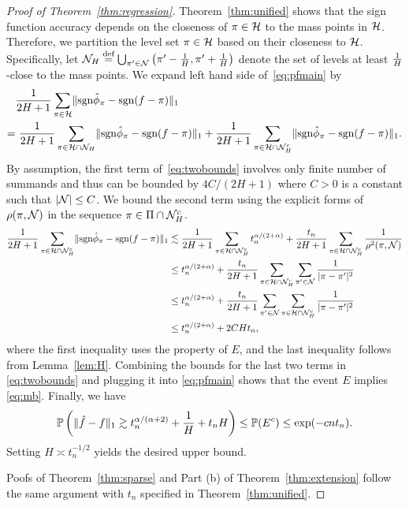 \documentclass[11pt]{article}
\theoremstyle{plain}
\theoremstyle{definition}
\def\sign{\textup{sgn}}
\begin{document}
\begin{proof}[Proof of Theorem~\ref{thm:regression}]
Theorem~\ref{thm:unified} shows that the sign function accuracy depends on the closeness of $\pi\in \mathcal{H}$ to the mass points in $\mathcal{H}$. Therefore, we partition the level set $\pi \in \mathcal{H}$ based on their closeness to $\mathcal{H}$. Specifically, let $\mathcal{N}_H \stackrel{\text{def}}{=}\bigcup_{\pi'\in\mathcal{N}}\left(\pi'-\frac{1}{H},\pi'+\frac{1}{H}\right)$ denote the set of levels at least $1\over H$-close to the mass points. We expand left hand side of~\eqref{eq:pfmain} by
\begin{align}\label{eq:twobounds}
&{1\over 2H+1}\sum_{\pi \in \tH}\onenormSize{}{\sign \hat \phi_\pi - \sign (f-\pi)} \notag \\
=& \ {1\over 2H+1}\sum_{\pi \in \tH \cap \tN_H} \onenormSize{}{\sign \hat \phi_\pi - \sign (f-\pi)} +{1\over 2H+1}\sum_{\pi \in \tH \cap \tN_H^c} \onenormSize{}{\sign \hat \phi_\pi - \sign (f-\pi)} .
\end{align}
By assumption, the first term of~\eqref{eq:twobounds} involves only finite number of summands and thus can be bounded by $4C/(2H + 1)$ where $C > 0$ is a constant such that $|\mathcal{N}|\leq C$. We bound the second term using the explicit forms of $\rho(\pi, \mathcal{N})$ in the sequence $\pi \in\Pi\cap \mathcal{N}_H^c$. 
\begin{align}
{1\over 2H+1}\sum_{\pi \in \tH\cap \tN_H^c} \onenormSize{}{\sign \hat \phi_\pi- \sign (f-\pi)} &\lesssim  {1\over 2H+1}\sum_{\pi\in \tH\cap \tN_H^c} t_n^{\alpha/(2+\alpha)}+{t_n\over 2H+1}\sum_{\pi \in \tH\cap \tN_H^c}{1\over \rho^2(\pi, \tN)}\\
&\leq t_n^{\alpha/(2+\alpha)}+{t_n\over 2H+1} \sum_{\pi \in \tH\cap \tN_H^c} \sum_{\pi' \in \tN}{1\over |\pi-\pi'|^2}\\
&\leq  t_n^{\alpha/(2+\alpha)}+{t_n\over 2H+1} \sum_{\pi'\in \tN} \sum_{\pi \in \tH\cap \tN_H^c}{1\over |\pi-\pi'|^2}\\
&\leq t_n^{\alpha/(2+\alpha)}+ 2CHt_n,
\end{align}
where the first inequality uses the property of $E$, and the last inequality follows from Lemma~\ref{lem:H}.  Combining the bounds for the last two terms in \eqref{eq:twobounds} and plugging it into \eqref{eq:pfmain} shows that the event $E$ implies \eqref{eq:mb}.  Finally, we have
\[
\mathbb{P}\left(\lVert\hat f-f\rVert_1\gtrsim t_n^{\alpha/(\alpha+2)}+{1\over H}+t_nH \right)\leq \mathbb{P	}(E^c)\leq \exp(-cnt_n).
\]
Setting $H\asymp t^{-1/2}_n$ yields the desired upper bound. 

Poofs of Theorem~\ref{thm:sparse} and Part (b) of Theorem~\ref{thm:extension} follow the same argument with $t_n$ specified in Theorem~\ref{thm:unified}.
 \end{proof}
\end{document}
